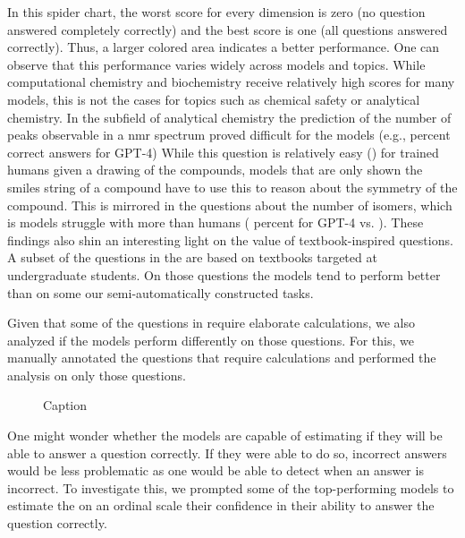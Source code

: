 \documentclass[11pt, oneside]{article}
\begin{document}
In this spider chart, the worst score for every dimension is zero (no question answered completely correctly) and the best score is one (all questions answered correctly). 
Thus, a larger colored area indicates a better performance. 
One can observe that this performance varies widely across models and topics. 
While computational chemistry and biochemistry receive relatively high scores for many models, this is not the cases for topics such as chemical safety or analytical chemistry.
In the subfield of analytical chemistry the prediction of the number of peaks observable in a \gls{nmr} spectrum proved difficult for the models (e.g.,  percent correct answers for GPT-4) 
While this question is relatively easy () for trained humans given a drawing of the compounds, models that are only shown the \gls{smiles} string of a compound have to use this to reason about the symmetry of the compound. 
This is mirrored in the questions about the number of isomers, which is models struggle with more than humans ( percent for GPT-4 vs. ).
These findings also shin an interesting light on the value of textbook-inspired questions. A subset of the questions in the \chembench are based on textbooks targeted at undergraduate students. 
On those questions the models tend to perform better than on some our semi-automatically constructed tasks.


Given that some of the questions in \chembench require elaborate calculations, we also analyzed if the models perform differently on those questions.
For this, we manually annotated the questions that require calculations and performed the analysis on only those questions. 

\begin{figure}
    \centering
    \caption{Caption}
    \label{fig:calculation_performance}
\end{figure}

One might wonder whether the models are capable of estimating if they will be able to answer a question correctly. 
If they were able to do so, incorrect answers would be less problematic as one would be able to detect when an answer is incorrect.
To investigate this, we prompted\cite{xiong2023llms} some of the top-performing models to estimate the on an ordinal scale their confidence in their ability to answer the question correctly.
\end{document}
